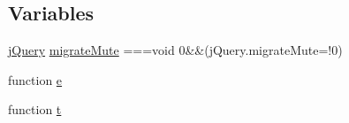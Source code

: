 \begin{DoxyCompactItemize}
\end{DoxyCompactItemize}
\subsection*{Variables}
\begin{DoxyCompactItemize}
\item 
\hyperlink{jquery_8autosize_8min_8js_a2b1d6f9c448e3ce72f4e1865d6e38d2c}{j\+Query} \hyperlink{jquery-migrate-1_82_81_8min_8js_ae195c77203e798bee6ede6c8c76c56ae}{migrate\+Mute} ===void 0\&\&(j\+Query.\+migrate\+Mute=!0)
\item 
function \hyperlink{jquery-migrate-1_82_81_8min_8js_a2c038346d47955cbe2cb91e338edd7e1}{e}
\item 
function \hyperlink{jquery-migrate-1_82_81_8min_8js_a23c5666e83bbbceee94adcd0851f50c4}{t}
\item 

\end{DoxyCompactItemize}
